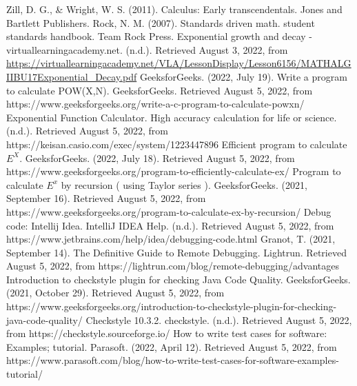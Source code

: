 \documentclass[a4paper,12pt]{report}
\begin{document}
\begin{thebibliography}{9}
 Zill, D. G., \& Wright, W. S. (2011). Calculus: Early transcendentals. Jones and Bartlett Publishers.
 Rock, N. M. (2007). Standards driven math. student standards handbook. Team Rock Press.
Exponential growth and decay - virtuallearningacademy.net. (n.d.). Retrieved August 3, 2022, from  \url{https://virtuallearningacademy.net/VLA/LessonDisplay/Lesson6156/MATHALGIIBU17Exponential_Decay.pdf}
GeeksforGeeks. (2022, July 19). Write a program to calculate POW(X,N). GeeksforGeeks. Retrieved August 5, 2022, from https://www.geeksforgeeks.org/write-a-c-program-to-calculate-powxn/
Exponential Function Calculator. High accuracy calculation for life or science. (n.d.). Retrieved August 5, 2022, from https://keisan.casio.com/exec/system/1223447896
Efficient program to calculate $E^X$. GeeksforGeeks. (2022, July 18). Retrieved August 5, 2022, from https://www.geeksforgeeks.org/program-to-efficiently-calculate-ex/
Program to calculate $E^x$ by recursion ( using Taylor series ). GeeksforGeeks. (2021, September 16). Retrieved August 5, 2022, from https://www.geeksforgeeks.org/program-to-calculate-ex-by-recursion/
Debug code: Intellij Idea. IntelliJ IDEA Help. (n.d.). Retrieved August 5, 2022, from https://www.jetbrains.com/help/idea/debugging-code.html
Granot, T. (2021, September 14). The Definitive Guide to Remote Debugging. Lightrun. Retrieved August 5, 2022, from https://lightrun.com/blog/remote-debugging/advantages
Introduction to checkstyle plugin for checking Java Code Quality. GeeksforGeeks. (2021, October 29). Retrieved August 5, 2022, from https://www.geeksforgeeks.org/introduction-to-checkstyle-plugin-for-checking-java-code-quality/
Checkstyle 10.3.2. checkstyle. (n.d.). Retrieved August 5, 2022, from https://checkstyle.sourceforge.io/
How to write test cases for software: Examples; tutorial. Parasoft. (2022, April 12). Retrieved August 5, 2022, from https://www.parasoft.com/blog/how-to-write-test-cases-for-software-examples-tutorial/
\end{thebibliography}
\end{document}
